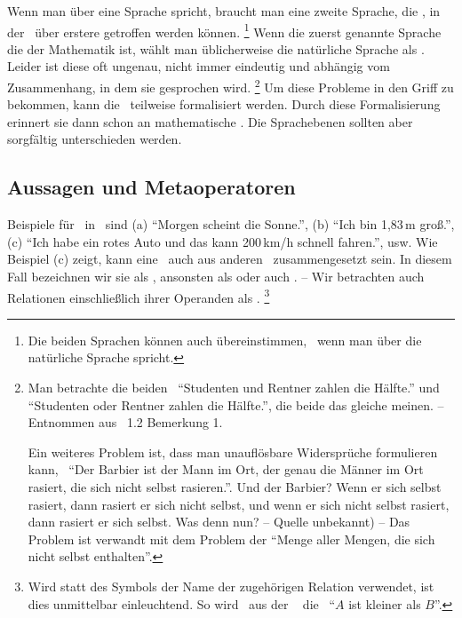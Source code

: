 Wenn man über eine Sprache spricht, braucht man eine zweite Sprache, die , in der \Aussagen\ über erstere getroffen werden können.%
\footnote{%
	Die beiden Sprachen können auch übereinstimmen, \textzB\ wenn man über die natürliche Sprache spricht.
}
Wenn die zuerst genannte Sprache die der Mathematik ist, wählt man üblicherweise die natürliche Sprache als \Metasprache.
Leider ist diese oft ungenau, nicht immer eindeutig und abhängig vom Zusammenhang, in dem sie gesprochen wird.%
\footnote{%
	Man betrachte die beiden \Aussagen\ \enquote{Studenten und Rentner zahlen die Hälfte.} und \enquote{Studenten oder Rentner zahlen die Hälfte.}, die beide das gleiche meinen.
	-- Entnommen aus \cite{bib:Rautenberg} \sectionname~1.2 Bemerkung 1.

	Ein weiteres Problem ist, dass man unauflösbare Widersprüche formulieren kann, \textzB\ \enquote{Der Barbier ist der Mann im Ort, der genau die Männer im Ort rasiert, die sich nicht selbst rasieren.}.
	Und der Barbier?
	Wenn er sich selbst rasiert, dann rasiert er sich nicht selbst, und wenn er sich nicht selbst rasiert, dann rasiert er sich selbst.
	Was denn nun?
	-- Quelle unbekannt) --
	Das Problem ist verwandt mit dem Problem der \enquote{Menge aller Mengen, die sich nicht selbst enthalten}.
}
Um diese Probleme in den Griff zu bekommen, kann die \Metasprache\ teilweise formalisiert werden.
Durch diese Formalisierung erinnert sie dann schon an mathematische \Formeln.
Die Sprachebenen sollten aber sorgfältig unterschieden werden.

\subsection{Aussagen und Metaoperatoren}%
\label{sub:AussagenUndMetaoperatoren}

Beispiele für \Aussagen\ in \Metasprache\ sind
(a) \enquote{Morgen scheint die Sonne.},
(b) \enquote{Ich bin 1,83\,m groß.},
(c) \enquote{Ich habe ein rotes Auto und das kann 200\,km/h schnell fahren.}, usw.
Wie Beispiel (c) zeigt, kann eine \Aussage\ auch aus anderen \Aussagen\ zusammengesetzt sein.
In diesem Fall bezeichnen wir sie als , ansonsten als  oder auch .
-- Wir betrachten auch Relationen einschließlich ihrer Operanden als \Aussagen.%
\footnote{%
	Wird statt des Symbols der Name der zugehörigen Relation verwendet, ist dies unmittelbar einleuchtend.
	So wird \textzB\ aus der \Formel\  die \Aussage\ \enquote{$A$ ist kleiner als $B$}.
}

